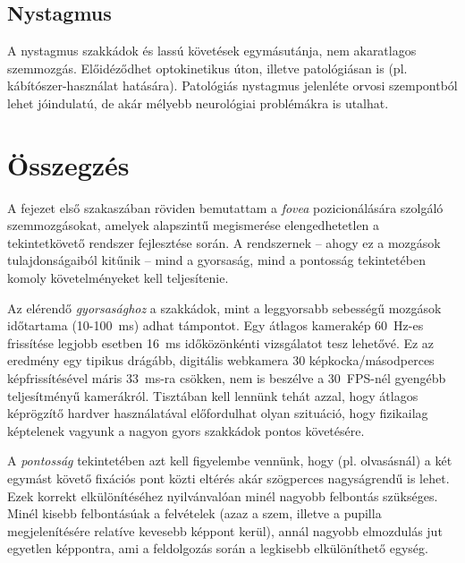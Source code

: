 \subsection{Nystagmus}\label{sect:nystagmus}

A nystagmus szakkádok és lassú követések egymásutánja, nem akaratlagos szemmozgás. Előidéződhet optokinetikus úton, illetve patológiásan is (pl. kábítószer-használat hatására). Patológiás nystagmus jelenléte orvosi szempontból lehet jóindulatú, de akár mélyebb neurológiai problémákra is utalhat.

\section{Összegzés}\label{sect:mozg_osszegzes}

A fejezet első szakaszában röviden bemutattam a \emph{fovea} pozicionálására szolgáló szemmozgásokat, amelyek alapszintű megismerése elengedhetetlen a tekintetkövető rendszer fejlesztése során. A rendszernek -- ahogy ez a mozgások tulajdonságaiból kitűnik -- mind a gyorsaság, mind a pontosság tekintetében komoly követelményeket kell teljesítenie.

Az elérendő \textit{gyorsasághoz} a szakkádok, mint a leggyorsabb sebességű mozgások időtartama (10-100~ms) adhat támpontot. Egy átlagos kamerakép 60~Hz-es frissítése legjobb esetben 16~ms időközönkénti vizsgálatot tesz lehetővé. Ez az eredmény egy tipikus drágább, digitális webkamera 30 képkocka/másodperces képfrissítésével máris 33~ms-ra csökken, nem is beszélve a 30~FPS-nél gyengébb teljesítményű kamerákról. Tisztában kell lennünk tehát azzal, hogy átlagos képrögzítő hardver használatával előfordulhat olyan szituáció, hogy fizikailag képtelenek vagyunk a nagyon gyors szakkádok pontos követésére.

A \textit{pontosság} tekintetében azt kell figyelembe vennünk, hogy (pl. olvasásnál) a két egymást követő fixációs pont közti eltérés akár szögperces nagyságrendű is lehet. Ezek korrekt elkülönítéséhez nyilvánvalóan minél nagyobb felbontás szükséges. Minél kisebb felbontásúak a felvételek (azaz a szem, illetve a pupilla megjelenítésére relatíve kevesebb képpont kerül), annál nagyobb elmozdulás jut egyetlen képpontra, ami a feldolgozás során a legkisebb elkülöníthető egység.
